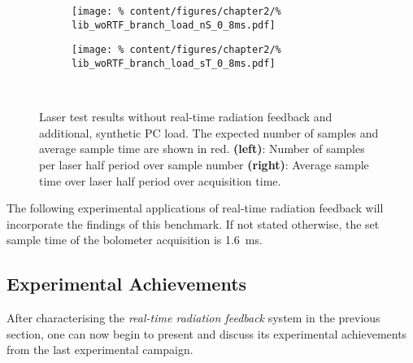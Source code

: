             \begin{figure}[t]%
                \centering%
                \begin{subfigure}{0.48\textwidth}%
                    \texttt{[image: \%
                        content/figures/chapter2/\%
                        lib\_woRTF\_branch\_load\_nS\_0\_8ms.pdf]}%
                \end{subfigure}%
                \hspace*{0.25cm}%
                \begin{subfigure}{0.48\textwidth}%
                    \texttt{[image: \%
                        content/figures/chapter2/\%
                        lib\_woRTF\_branch\_load\_sT\_0\_8ms.pdf]}%
                \end{subfigure}\\%
                \caption{Laser test results without real-time radiation feedback and additional, synthetic PC load. The expected number of samples and average sample time are shown in red. \textbf{(left)}: Number of samples per laser half period over sample number \textbf{(right)}: Average sample time over laser half period over acquisition time.}\label{fig:woRTF_load}%
            \end{figure}%
%
            The following experimental applications of real-time radiation feedback will incorporate the findings of this benchmark. If not stated otherwise, the set sample time of the bolometer acquisition is \SI{1.6}{\milli\second}.%
%
    \subsection{Experimental Achievements}\label{sec:feedbackachieve}%
%
        After characterising the \textit{real-time radiation feedback} system in the previous section, one can now begin to present and discuss its experimental achievements from the last experimental campaign.%

